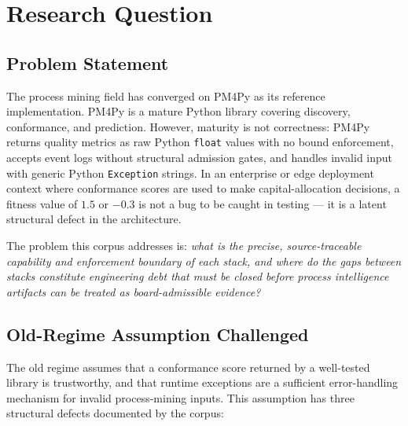 
\section{Research Question}
\label{sec:comparisons-rq}

\subsection{Problem Statement}
\label{sec:comparisons-rq-problem}

The process mining field has converged on PM4Py as its reference implementation.
PM4Py is a mature Python library covering discovery, conformance, and prediction.
However, maturity is not correctness: PM4Py returns quality metrics as raw Python
\texttt{float} values with no bound enforcement, accepts event logs without
structural admission gates, and handles invalid input with generic Python
\texttt{Exception} strings. In an enterprise or edge deployment context where
conformance scores are used to make capital-allocation decisions, a fitness value
of $1.5$ or $-0.3$ is not a bug to be caught in testing --- it is a latent
structural defect in the architecture.

The problem this corpus addresses is: \emph{what is the precise, source-traceable
capability and enforcement boundary of each stack, and where do the gaps between
stacks constitute engineering debt that must be closed before process intelligence
artifacts can be treated as board-admissible evidence?}

\subsection{Old-Regime Assumption Challenged}
\label{sec:comparisons-rq-old-regime}

The old regime assumes that a conformance score returned by a well-tested library
is trustworthy, and that runtime exceptions are a sufficient error-handling
mechanism for invalid process-mining inputs. This assumption has three structural
defects documented by the corpus:

